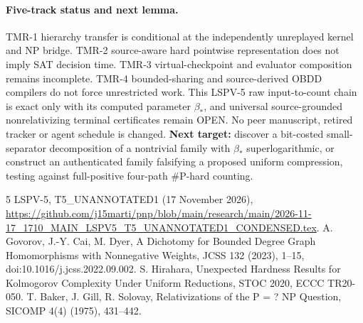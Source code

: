 \documentclass[11pt]{article}
\begin{document}
\paragraph{Five-track status and next lemma.}
TMR-1 hierarchy transfer is conditional at the independently unreplayed kernel and NP bridge. TMR-2 source-aware hard pointwise representation does not imply SAT decision time. TMR-3 virtual-checkpoint and evaluator composition remains incomplete. TMR-4 bounded-sharing and source-derived OBDD compilers do not force unrestricted work. This LSPV-5 raw input-to-count chain is exact only with its computed parameter $\beta_*$, and universal source-grounded nonrelativizing terminal certificates remain OPEN. No peer manuscript, retired tracker or agent schedule is changed.
\textbf{Next target:} discover a bit-costed small-separator decomposition of a nontrivial family with $\beta_*$ superlogarithmic, or construct an authenticated family falsifying a proposed uniform compression, testing against full-positive four-path \#P-hard counting.
\begin{thebibliography}{5}
 LSPV-5, T5\_UNANNOTATED1 (17 November 2026), \url{https://github.com/j15marti/pnp/blob/main/research/main/2026-11-17_1710_MAIN_LSPV5_T5_UNANNOTATED1_CONDENSED.tex}.
 A. Govorov, J.-Y. Cai, M. Dyer, A Dichotomy for Bounded Degree Graph Homomorphisms with Nonnegative Weights, JCSS 132 (2023), 1--15, doi:10.1016/j.jcss.2022.09.002.
 S. Hirahara, Unexpected Hardness Results for Kolmogorov Complexity Under Uniform Reductions, STOC 2020, ECCC TR20-050.
 T. Baker, J. Gill, R. Solovay, Relativizations of the P = ? NP Question, SICOMP 4(4) (1975), 431--442.
\end{thebibliography}
\end{document}

